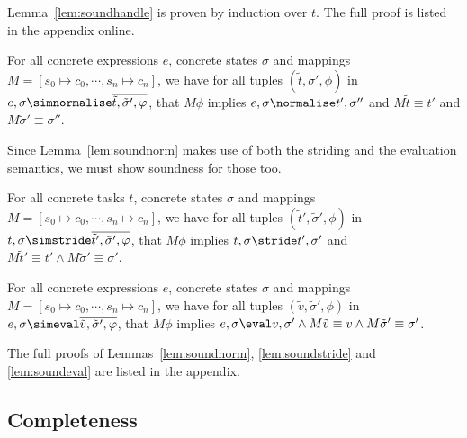 Lemma~\ref{lem:soundhandle} is proven by induction over $t$.
The full proof is listed in the appendix online.

\begin{lemma}
  \label{lem:soundnorm}

  For all concrete expressions $e$, concrete states $\sigma$ and mappings $M=[s_0\mapsto c_0,\cdots,s_n\mapsto c_n]$,
  we have for all tuples $(\tilde{t},\tilde{\sigma}',\phi)$ in
  $e,\sigma\simnormalise \overline{\tilde{t},\tilde{\sigma}',\phi}$,
  that $M\phi$ implies
  $e,\sigma \normalise t',\sigma''$ and $M \tilde{t} \equiv t'$ and $M\tilde{\sigma}' \equiv \sigma''$.

\end{lemma}

Since Lemma~\ref{lem:soundnorm} makes use of both the striding and the evaluation semantics,
we must show soundness for those too.

\begin{lemma}
  \label{lem:soundstride}
  For all concrete tasks $t$, concrete states $\sigma$ and mappings $M=[s_0\mapsto c_0,\cdots,s_n\mapsto c_n]$,
    we have for all tuples $(\tilde{t}',\tilde{\sigma}',\phi)$
    in $t,\sigma\simstride \overline{\tilde{t}',\tilde{\sigma}',\phi}$,
    that $M \phi$ implies
    $t,\sigma \stride t',\sigma'$ and $M \tilde{t}' \equiv t' \land M\tilde{\sigma}' \equiv \sigma'$.

\end{lemma}

\begin{lemma}
  \label{lem:soundeval}

  For all concrete expressions $e$, concrete sta\-tes $\sigma$ and mappings $M=[s_0\mapsto c_0,\cdots,s_n\mapsto c_n]$,
    we have for all tuples $(\tilde{v},\tilde{\sigma}',\phi)$
    in $e,\sigma\simeval \overline{\tilde{v},\tilde{\sigma}',\phi}$,
    that $M\phi$ implies
    $e,\sigma \eval v,\sigma' \land M\tilde{v} \equiv v \wedge M\tilde{\sigma}' \equiv \sigma'$.

\end{lemma}

The full proofs of Lemmas~\ref{lem:soundnorm}, \ref{lem:soundstride} and \ref{lem:soundeval} are listed in the appendix.





\subsection{Completeness}

